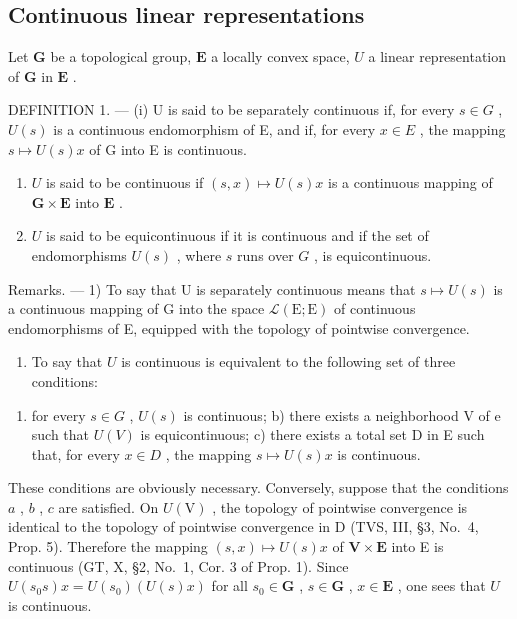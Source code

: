 \subsection{Continuous linear representations}

Let \(\mathbf{G}\) be a topological group, \(\mathbf{E}\) a locally convex space, \(U\) a linear representation of \(\mathbf{G}\) in \(\mathbf{E}\) .

DEFINITION 1. --- (i) U is said to be separately continuous if, for every \(s \in G\) , \(U(s)\) is a continuous endomorphism of E, and if, for every \(x \in E\) , the mapping \(s \mapsto U(s)x\) of G into E is continuous.

\begin{enumerate}
\def\labelenumi{(\roman{enumi})}
\setcounter{enumi}{1}
\item
  \(U\) is said to be continuous if \((s,x)\mapsto U(s)x\) is a continuous mapping of \(\mathbf{G}\times \mathbf{E}\) into \(\mathbf{E}\) .
\item
  \(U\) is said to be equicontinuous if it is continuous and if the set of endomorphisms \(U(s)\) , where \(s\) runs over \(G\) , is equicontinuous.
\end{enumerate}

Remarks. --- 1) To say that U is separately continuous means that \(s \mapsto U(s)\) is a continuous mapping of G into the space \(\mathcal{L}(\mathrm{E};\mathrm{E})\) of continuous endomorphisms of E, equipped with the topology of pointwise convergence.

\begin{enumerate}
\def\labelenumi{\arabic{enumi})}
\setcounter{enumi}{1}
\tightlist
\item
  To say that \(U\) is continuous is equivalent to the following set of three conditions:
\end{enumerate}

\begin{enumerate}
\def\labelenumi{\alph{enumi})}
\tightlist
\item
  for every \(s \in G\) , \(U(s)\) is continuous; b) there exists a neighborhood V of e such that \(U(V)\) is equicontinuous; c) there exists a total set D in E such that, for every \(x \in D\) , the mapping \(s \mapsto U(s)x\) is continuous.
\end{enumerate}

These conditions are obviously necessary. Conversely, suppose that the conditions \(a\) , \(b\) , \(c\) are satisfied. On \(U(\mathrm{V})\) , the topology of pointwise convergence is identical to the topology of pointwise convergence in D (TVS, III, §3, No.~4, Prop. 5). Therefore the mapping \((s,x)\mapsto U(s)x\) of \(\mathbf{V}\times \mathbf{E}\) into E is continuous (GT, X, §2, No.~1, Cor. 3 of Prop. 1). Since \(U(s_0s)x = U(s_0)(U(s)x)\) for all \(s_0\in \mathbf{G}\) , \(s\in \mathbf{G}\) , \(x\in \mathbf{E}\) , one sees that \(U\) is continuous.

